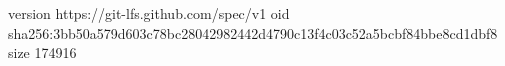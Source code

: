 version https://git-lfs.github.com/spec/v1
oid sha256:3bb50a579d603c78bc28042982442d4790c13f4c03c52a5bcbf84bbe8cd1dbf8
size 174916
